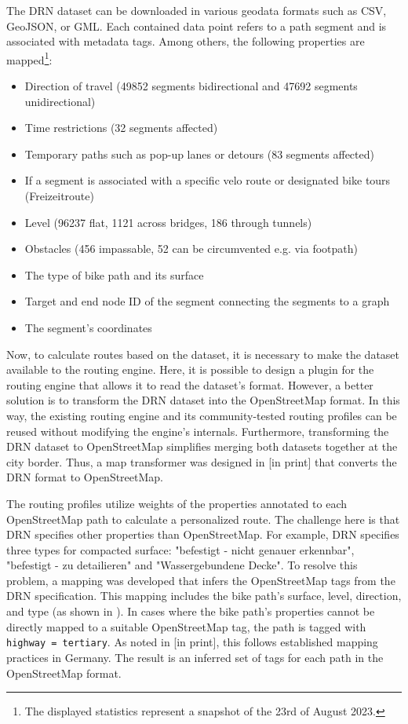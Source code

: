 The DRN dataset can be downloaded in various geodata formats such as CSV, GeoJSON, or GML. Each contained data point refers to a path segment and is associated with metadata tags. Among others, the following properties are mapped\footnote{The displayed statistics represent a snapshot of the 23rd of August 2023.}:

\begin{itemize}
    \item Direction of travel (49852 segments bidirectional and 47692 segments unidirectional)
    \item Time restrictions (32 segments affected)
    \item Temporary paths such as pop-up lanes or detours (83 segments affected)
    \item If a segment is associated with a specific velo route or designated bike tours (Freizeitroute)
    \item Level (96237 flat, 1121 across bridges, 186 through tunnels)
    \item Obstacles (456 impassable, 52 can be circumvented e.g. via footpath)
    \item The type of bike path and its surface
    \item Target and end node ID of the segment connecting the segments to a graph
    \item The segment's coordinates
\end{itemize}

Now, to calculate routes based on the dataset, it is necessary to make the dataset available to the routing engine. Here, it is possible to design a plugin for the routing engine that allows it to read the dataset's format. However, a better solution is to transform the DRN dataset into the OpenStreetMap format. In this way, the existing routing engine and its community-tested routing profiles can be reused without modifying the engine's internals. Furthermore, transforming the DRN dataset to OpenStreetMap simplifies merging both datasets together at the city border. Thus, a map transformer was designed in [in print] that converts the DRN format to OpenStreetMap.

The routing profiles utilize weights of the properties annotated to each OpenStreetMap path to calculate a personalized route. The challenge here is that DRN specifies other properties than OpenStreetMap. For example, DRN specifies three types for compacted surface: "befestigt - nicht genauer erkennbar", "befestigt - zu detailieren" and "Wassergebundene Decke". To resolve this problem, a mapping was developed that infers the OpenStreetMap tags from the DRN specification. This mapping includes the bike path's surface, level, direction, and type (as shown in ). In cases where the bike path's properties cannot be directly mapped to a suitable OpenStreetMap tag, the path is tagged with \texttt{highway = tertiary}. As noted in [in print], this follows established mapping practices in Germany. The result is an inferred set of tags for each path in the OpenStreetMap format.

